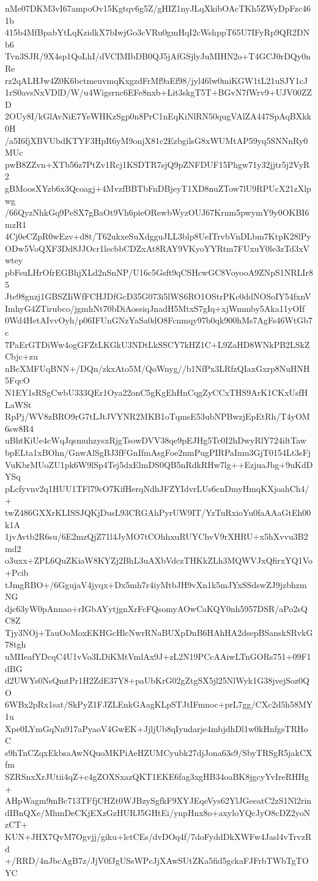 nMe07DKM3vI67ampoOv15Kgtqv6g5Z/gHIZ1nyJLqXkibOAcTKh5ZWyDpFzc461b
415b4MfBpabYtLqKzidkX7bIwjGo3cVRu0gmHqI2cWshppT65U7IFyRp9QR2DNb6
Tvn3SJR/9X4sp1QoLhI/dVCIMIbDB0QJ5jAfGSjlyJuMIHN2o+T4GCJ0rDQy0nRe
rz2qALHJw4Z0K6bctmeuvmqKxgzdFrMf9aEf98/jyl46lw0miKGW1tL21uSJY1cJ
1rS0avsNxVDlD/W/u4Wigsrnc6EFe8nxb+Lit3skgT5T+BGvN7fWrv9+UJV00ZZD
2OUy8I/kGlAvNiE7YeWHKzSgp0n8PrC1nEqKiNlRN50qugVAlZA447SpAqBXkk0H
/a5I6fjXBVUbdKTYF3HpR6yM9onjX81c2EzbgilsG8xWUMtAP59yq5SNNnRy0MUc
pwB8ZZvn+XTb56z7PtZv1Rcj1KSDTR7sjQ9pZNFDUF15Phgw71y32jjtr5j2VyR2
gBMoosXYzb6x3Qcoagj+4MvzfBBTbFnDBjeyT1XD8nuZTow7lU9RPUcX21zXlpwg
/66QyzNhkGq9PeSX7gBaOt9Vh6pieORewbWyzOUJ67Krnm5pwymY9y0OKBI6mzR1
4Cj0eCZpR0wEzv+d8t/T62ukxeSuXdgguJLL3blp8UeITrvbVnDLbm7KtpK28lPy
ODw5VoQXF3Dd8JJOcr1lecbbCDZxAt8RAY9VKyoYYRtm7FUxuY0le3zTd3xVwtey
pbFsuLHrOfrEGBhjXLd2nSnNP/U16c5Gsft9qCSHcwGC8VoyooA9ZNpS1NRLIr85
Jte98gnzj1GBSZIiWfFCHJDfGcD35G073i5lWS6RO1OStrPKc0ddNOSoIY54fxnV
ImhyG4ZTirubco/jgmhNt70bDiAossiqJnadH5MtxS7gIq+xjWmmby5Aka11yOIf
0Wd4HetAIvvOyh/p06IFUnGNzYaSa0dO8Fcnmqy97b0qk900hMs7AgFs46WtGb7c
7PaErGTDiWw4ogGFZtLKGkU3NDtLkSSCY7kHZ1C+L9ZaHD8WNkPB2LSkZCbjc+zu
nBcXMFUqBNN+/DQn/zkxAto5M/QoWnyg//b1NfPx3LRfzQIaxGxrp8NuHNH5FqcO
N1EY1sRSgCwbU333QEr1Oya22onC5gKgEhHnCqgZyCCxTHS9ArK1CKxUsfHLaWSt
RpPj/WV8zBRO9rG7tLJtJVYNR2MKB1oTqmsE53ubNPBwzjEpEtRh/T4yOM6sw8R4
uBhtKiUe4cWqJqsmuhzysxRjgTsowDVV38qe9pEJHg5Tc0I2hDwyRlY724iltTaw
bpELta1xBOhn/GnwAlSgBJ3fFGnIfmAsgFoe2nmPugPIRPaInm3GjT0154Lt3sFj
VuKbrMUoZU1pk6W9lSp4Tej5dxElmDS0QB5nRdkRHw7lg++EzjuaJbg+9uKdDYSq
pLcfyvnv2q1HUU1TFl79cO7KifHerqNdhJFZYIdvrLUs6cnDmyHmqKXjoahCh4/+
twZ486GXXrKLISSJQKjDusL93CRGAhPyrUW9IT/YzTuRxioYu0faAAaGtEh00k1A
1jvAvtb2R6su/6E2mzQjZ71l4JyMO7tCOhhxuRUYChvV9rXHRU+x5hXvvu3B2md2
o3uxx+ZPL6QuZKiaW8KYZj2BhL3uAXbVdczTHKkZLh3MQWVJxQfirxYQ1Vo+Pcib
tJmgRBO+/6GgujaV4jyqx+Dx5mh7r4iyMtbJH9vXn1k5mJYxSSdswZJ9jzbhzmNG
djc63yW0pAnnao+rIGbAYytjgnXrFcFQsomyAOwCaKQY0nh5957DSR/aPo2sQC8Z
Tjy3NOj+TauOoMoxEKHGcHlcNwrRNaBUXpDnB6HAhHA2dsepBSanskSRvkG78tgh
uMIIeafYDcqC4U1vVo3LDiKMtVmlAx9J+zL2N19PCcAAiwLTnGORs751+09F1dBG
d2UWYs0NsQmtPr1H2ZdE37Y8+paUbKrG02gZtgSX5jl25NlWyk1G38jvejSoz0QO
6WBx2pRx1sat/SkPyZ1FJZLEnkGAagKLpSTJtIFmnoc+prL7gg/CXc2d5h58MY1u
Xpe0LYmGqNn917aPyaoV4GwEK+JjljUb8qIyudarje4mbjdhDl1w0kHnfgsTRHoC
s9hTnCZqxEkbsaAwNQuoMKPiAeHZUMCyubk27djJona63s9/SbyTRSgR5jakCXfm
SZRSnxXrJUtii4qZ+c4gZOXSxazQKT1EKE6fag3xgHB34oaBK8jgcyYvIreRHHg+
AHpWagm9mBc713TFfjCHZt0WJBzySgfkF9XYJEqeVys62YlJGeeatC2zS1Nl2rin
dIBnQXe/MhmDeCKjEXzGzHURJ5GHtEi/ynpHnx8o+axyloYQcJyO8cDZ2yoNzCT+
KUN+JHX7QvM7Ogvjj/giku+lctCEs/dvDOq4f/7doFyddDkXWFw4Jasl4vTrvzRd
+/RRD/4nJbcAgB7z/JjV0fJgUSsWPcJjXAwSUtZKa5fid5gckaFJFrbTWbTgTOYC
